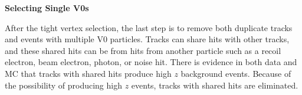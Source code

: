 \clearpage

\textbf{Selecting Single V0s}




After the tight vertex selection, the last step is to remove both duplicate tracks and events with multiple V0 particles. Tracks can share hits with other tracks, and these shared hits can be from hits from another particle such as a recoil electron, beam electron, photon, or noise hit. There is evidence in both data and MC that tracks with shared hits produce high $z$ background events. %
Because of the possibility of producing high $z$ events, tracks with shared hits are eliminated. %

